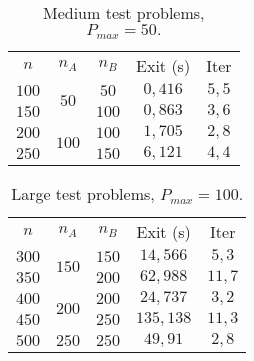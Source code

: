 \documentclass[opre,nonblindrev]{informs3} %
\begin{document}
\begin{table}[h]\scriptsize
	\begin{center}
		\begin{tabular}{|| c |c | c|| c||c ||}\hline
			
			\multirow{3}{*}{$n$} & \multirow{3}{*}{$n_A$} & \multirow{3}{*}{$n_B$} & \multirow{3}{*}{Exit (s)} & \multirow{3}{*}{Iter}\\
			&  &&  & \\
			&    &    &  &\\\hline
			$100$	 & \multirow{2}{*}{$50$}   & $50$   & $0,416$
			&$5,5$
			\\
			$150$  &  & $100$	 &$0,863$
			&$3,6$
			\\ \hline
			
			$200$	 & \multirow{2}{*}{$100$}   & $100$   & $1,705$
			&$2,8$
			\\
			$250$  &  & $150$	 & $6,121$
			&$4,4$
			\\ \hline
			
		\end{tabular}
	\end{center}
	\caption{Medium test problems, $P_{max}= 50.$} \label{medium}
\end{table}


\begin{table}[h]\scriptsize
	\begin{center}
		\begin{tabular}{|| c |c | c|| c||c ||}\hline
			
			\multirow{3}{*}{$n$} & \multirow{3}{*}{$n_A$} & \multirow{3}{*}{$n_B$} & \multirow{3}{*}{Exit (s)} & \multirow{3}{*}{Iter}\\
			&  &&  & \\
			&    &    & &\\\hline
			$300$	 & \multirow{2}{*}{$150$}   & $150$   &$14,566$
			& $5,3$
			\\
			$350$  &  & $200$	 &$ 62,988$
			&$11,7$
			\\ \hline
			
			$400$	 & \multirow{2}{*}{$200$}   & $200$   &$ 24,737$
			&$3,2$
			\\
			$450$  &  & $250$	 &$135,138$
			&$11,3$
			\\ \hline
			
			$500$	 & $250$   & $250$   &  $49,91$
			&$2,8$
			\\ \hline
			
		\end{tabular}
	\end{center}
	\caption{Large test problems, $P_{max}= 100.$} \label{large}
\end{table}
\end{document}

